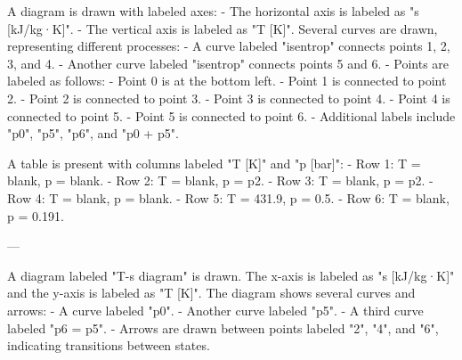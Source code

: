 A diagram is drawn with labeled axes:  
- The horizontal axis is labeled as "s [kJ/kg·K]".  
- The vertical axis is labeled as "T [K]".  
Several curves are drawn, representing different processes:  
- A curve labeled "isentrop" connects points 1, 2, 3, and 4.  
- Another curve labeled "isentrop" connects points 5 and 6.  
- Points are labeled as follows:  
  - Point 0 is at the bottom left.  
  - Point 1 is connected to point 2.  
  - Point 2 is connected to point 3.  
  - Point 3 is connected to point 4.  
  - Point 4 is connected to point 5.  
  - Point 5 is connected to point 6.  
- Additional labels include "p0", "p5", "p6", and "p0 + p5".  

A table is present with columns labeled "T [K]" and "p [bar]":  
- Row 1: T = blank, p = blank.  
- Row 2: T = blank, p = p2.  
- Row 3: T = blank, p = p2.  
- Row 4: T = blank, p = blank.  
- Row 5: T = 431.9, p = 0.5.  
- Row 6: T = blank, p = 0.191.  

---

A diagram labeled "T-s diagram" is drawn. The x-axis is labeled as "s [kJ/kg·K]" and the y-axis is labeled as "T [K]".  
The diagram shows several curves and arrows:  
- A curve labeled "p0".  
- Another curve labeled "p5".  
- A third curve labeled "p6 = p5".  
- Arrows are drawn between points labeled "2", "4", and "6", indicating transitions between states.